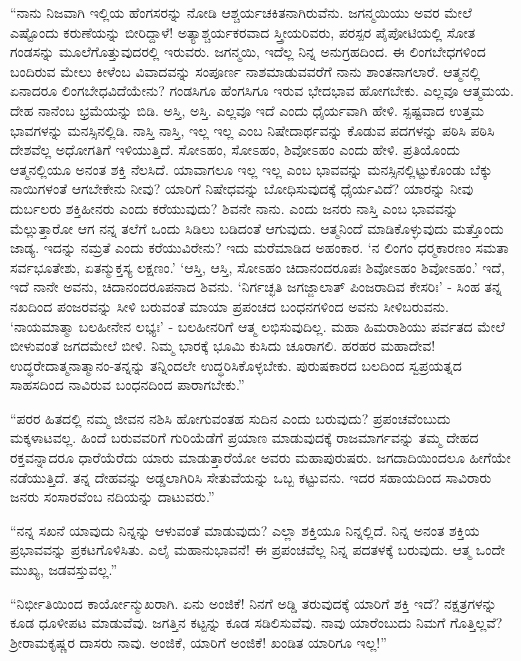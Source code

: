  “ನಾನು ನಿಜವಾಗಿ ಇಲ್ಲಿಯ ಹೆಂಗಸರನ್ನು ನೋಡಿ ಆಶ್ಚರ್ಯಚಕಿತನಾಗಿರುವೆನು. ಜಗನ್ಮಯಿಯು ಅವರ ಮೇಲೆ ಎಷ್ಟೊಂದು ಕರುಣೆಯನ್ನು ಬೀರಿದ್ದಾಳೆ! ಅತ್ಯಾಶ್ಚರ್ಯಕರವಾದ ಸ್ತ್ರೀಯರಿವರು, ಪರಸ್ಪರ ಪೈಪೋಟಿಯಲ್ಲಿ ಸೋತ ಗಂಡಸನ್ನು ಮೂಲೆಗೊತ್ತುವುದರಲ್ಲಿ ಇರುವರು. ಜಗನ್ಮಯಿ, ಇದೆಲ್ಲ ನಿನ್ನ ಅನುಗ್ರಹದಿಂದ. ಈ ಲಿಂಗಬೇಧಗಳಿಂದ ಬಂದಿರುವ ಮೇಲು ಕೀಳೆಂಬ ವಿವಾದವನ್ನು ಸಂಪೂರ್ಣ ನಾಶಮಾಡುವವರೆಗೆ ನಾನು ಶಾಂತನಾಗಲಾರೆ. ಆತ್ಮನಲ್ಲಿ ಏನಾದರೂ‌ ಲಿಂಗಬೇಧವಿದೆಯೇನು? ಗಂಡಸಿಗೂ ಹೆಂಗಸಿಗೂ ಇರುವ ಭೇದಭಾವ ಹೋಗಬೇಕು. ಎಲ್ಲವೂ ಆತ್ಮಮಯ. ದೇಹ ನಾನೆಂಬ ಭ್ರಮೆಯನ್ನು ಬಿಡಿ. ಅಸ್ತಿ, ಅಸ್ತಿ. ಎಲ್ಲವೂ ಇದೆ ಎಂದು ಧೈರ್ಯವಾಗಿ ಹೇಳಿ. ಸ್ಪಷ್ಟವಾದ ಉತ್ತಮ ಭಾವಗಳನ್ನು ಮನಸ್ಸಿನಲ್ಲಿಡಿ. ನಾಸ್ತಿ ನಾಸ್ತಿ, ಇಲ್ಲ ಇಲ್ಲ ಎಂಬ ನಿಷೇದಾರ್ಥವನ್ನು ಕೊಡುವ ಪದಗಳನ್ನು ಪಠಿಸಿ ಪಠಿಸಿ ದೇಶವೆಲ್ಲ ಅಧೋಗತಿಗೆ ಇಳಿಯುತ್ತಿದೆ. ಸೋಽಹಂ, ಸೋಽಹಂ, ಶಿವೋಽಹಂ ಎಂದು ಹೇಳಿ. ಪ್ರತಿಯೊಂದು ಆತ್ಮನಲ್ಲಿಯೂ ಅನಂತ ಶಕ್ತಿ ನೆಲಸಿದೆ. ಯಾವಾಗಲೂ ಇಲ್ಲ ಇಲ್ಲ ಎಂಬ ಭಾವವನ್ನು ಮನಸ್ಸಿನಲ್ಲಿಟ್ಟುಕೊಂಡು ಬೆಕ್ಕು ನಾಯಿಗಳಂತೆ ಆಗಬೇಕೇನು ನೀವು? ಯಾರಿಗೆ ನಿಷೇಧವನ್ನು ಬೋಧಿಸುವುದಕ್ಕೆ ಧೈರ್ಯವಿದೆ? ಯಾರನ್ನು ನೀವು ದುರ್ಬಲರು ಶಕ್ತಿಹೀನರು ಎಂದು ಕರೆಯುವುದು? ಶಿವನೇ ನಾನು. ಎಂದು ಜನರು ನಾಸ್ತಿ ಎಂಬ ಭಾವವನ್ನು ಮೆಲ್ಲುತ್ತಾರೋ ಆಗ ನನ್ನ ತಲೆಗೆ ಒಂದು ಸಿಡಿಲು ಬಡಿದಂತೆ ಆಗುವುದು. ಆತ್ಮನಿಂದೆ ಮಾಡಿಕೊಳ್ಳುವುದು ಮತ್ತೊಂದು ಜಾಡ್ಯ. ಇದನ್ನು ನಮ್ರತೆ ಎಂದು ಕರೆಯುವಿರೇನು? ಇದು ಮರೆಮಾಡಿದ ಅಹಂಕಾರ. ‘ನ ಲಿಂಗಂ ಧರ‍್ಮಕಾರಣಂ ಸಮತಾ ಸರ್ವಭೂತೇಶು, ಏತನ್ಮುಕ್ತಸ್ಯ ಲಕ್ಷಣಂ.’ ‘ಆಸ್ತಿ, ಆಸ್ತಿ, ಸೋಽಹಂ ಚಿದಾನಂದರೂಪಃ ಶಿವೋಽಹಂ ಶಿವೋಽಹಂ.’ ಇದೆ, ಇದೆ ನಾನೇ ಅವನು, ಚಿದಾನಂದರೂಪನಾದ ಶಿವನು. ‘ನಿರ್ಗಚ್ಛತಿ ಜಗಜ್ಜಾಲಾತ್ ಪಿಂಜರಾದಿವ ಕೇಸರಿಃ' - ಸಿಂಹ ತನ್ನ ನಖದಿಂದ ಪಂಜರವನ್ನು ಸೀಳಿ ಬರುವಂತೆ ಮಾಯಾ ಪ್ರಪಂಚದ ಬಂಧನಗಳಿಂದ ಅವನು ಸೀಳಿಬರುವನು. ‘ನಾಯಮಾತ್ಮಾ ಬಲಹೀನೇನ ಲಭ್ಯಃ’ - ಬಲಹೀನರಿಗೆ ಆತ್ಮ ಲಭಿಸುವುದಿಲ್ಲ. ಮಹಾ ಹಿಮರಾಶಿಯು ಪರ್ವತದ ಮೇಲೆ ಬೀಳುವಂತೆ ಜಗದಮೇಲೆ ಬೀಳಿ. ನಿಮ್ಮ ಭಾರಕ್ಕೆ ಭೂಮಿ ಕುಸಿದು ಚೂರಾಗಲಿ. ಹರಹರ ಮಹಾದೇವ! ಉದ್ಧರೇದಾತ್ಮನಾತ್ಮಾನಂ-ತನ್ನನ್ನು ತನ್ನಿಂದಲೇ ಉದ್ಧರಿಸಿಕೊಳ್ಳಬೇಕು. ಪುರುಷಕಾರದ ಬಲದಿಂದ ಸ್ವಪ್ರಯತ್ನದ ಸಾಹಸದಿಂದ ನಾವಿರುವ ಬಂಧನದಿಂದ ಪಾರಾಗಬೇಕು.” 

 “ಪರರ ಹಿತದಲ್ಲಿ ನಮ್ಮ ಜೀವನ ನಶಿಸಿ ಹೋಗುವಂತಹ ಸುದಿನ ಎಂದು ಬರುವುದು? ಪ್ರಪಂಚವೆಂಬುದು ಮಕ್ಕಳಾಟವಲ್ಲ. ಹಿಂದೆ ಬರುವವರಿಗೆ ಗುರಿಯೆಡೆಗೆ ಪ್ರಯಾಣ ಮಾಡುವುದಕ್ಕೆ ರಾಜಮಾರ್ಗವನ್ನು ತಮ್ಮ ದೇಹದ ರಕ್ತವನ್ನಾದರೂ ಧಾರೆಯೆರೆದು ಯಾರು ಮಾಡುತ್ತಾರೆಯೋ ಅವರು ಮಹಾಪುರುಷರು. ಜಗದಾದಿಯಿಂದಲೂ ಹೀಗೆಯೇ ನಡೆಯುತ್ತಿದೆ. ತನ್ನ ದೇಹವನ್ನು ಅಡ್ಡಲಾಗಿರಿಸಿ ಸೇತುವೆಯನ್ನು ಒಬ್ಬ ಕಟ್ಟುವನು. ಇದರ ಸಹಾಯದಿಂದ ಸಾವಿರಾರು ಜನರು ಸಂಸಾರವೆಂಬ ನದಿಯನ್ನು ದಾಟುವರು.” 

 “ನನ್ನ ಸಖನೆ ಯಾವುದು ನಿನ್ನನ್ನು ಆಳುವಂತೆ ಮಾಡುವುದು? ಎಲ್ಲಾ ಶಕ್ತಿಯೂ ನಿನ್ನಲ್ಲಿದೆ. ನಿನ್ನ ಅನಂತ ಶಕ್ತಿಯ ಪ್ರಭಾವವನ್ನು ಪ್ರಕಟಗೊಳಿಸಿತು. ಎಲೈ ಮಹಾನುಭಾವನೆ! ಈ ಪ್ರಪಂಚವೆಲ್ಲ ನಿನ್ನ ಪದತಳಕ್ಕೆ ಬರುವುದು. ಆತ್ಮ ಒಂದೇ ಮುಖ್ಯ, ಜಡವಸ್ತುವಲ್ಲ.” 

 “ನಿರ್ಭೀತಿಯಿಂದ ಕಾರ್ಯೋನ್ಮುಖರಾಗಿ. ಏನು ಅಂಜಿಕೆ! ನಿನಗೆ ಅಡ್ಡಿ ತರುವುದಕ್ಕೆ ಯಾರಿಗೆ ಶಕ್ತಿ ಇದೆ? ನಕ್ಷತ್ರಗಳನ್ನು ಕೂಡ ಧೂಳೀಪಟ ಮಾಡುವೆವು. ಜಗತ್ತಿನ ಕಟ್ಟನ್ನು ಕೂಡ ಸಡಿಲಿಸುವೆವು. ನಾವು ಯಾರೆಂಬುದು ನಿಮಗೆ ಗೊತ್ತಿಲ್ಲವೆ? ಶ‍್ರೀರಾಮಕೃಷ್ಣರ ದಾಸರು ನಾವು. ಅಂಜಿಕೆ, ಯಾರಿಗೆ ಅಂಜಿಕೆ! ಖಂಡಿತ ಯಾರಿಗೂ ಇಲ್ಲ!” 

